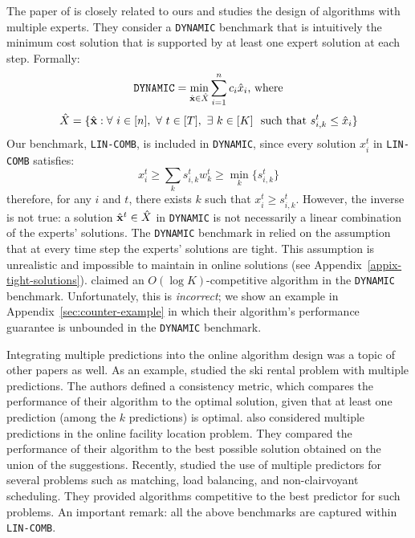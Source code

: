 The paper of \cite{AnandGe22:Online-Algorithms} is closely related to ours and studies the design of algorithms with multiple experts.
They consider a \texttt{DYNAMIC} benchmark that is intuitively
the minimum cost solution that is supported by at least one expert solution at each step. Formally:
\[\texttt{DYNAMIC} = \min_{\hat{\textbf{x}} \in \hat{X}} \sum_{i=1}^{n} c_i \hat{x}_i \textnormal{, where}\]
%
\[\hat{X} = \{\hat{\mathbf{x}} : \forall\ i \in [n],\ \forall\ t \in [T],\ \exists\ k \in [K]\ \textnormal{ such that } s_{i,k}^{t} \le \hat{x}_i \}\]
%
Our benchmark, \texttt{LIN-COMB}, is included in \texttt{DYNAMIC}, since every solution $x_{i}^{t}$ in \texttt{LIN-COMB} satisfies:
\[
	x_{i}^{t} \geq \sum_{k} s_{i,k}^{t}w_{k}^{t} \geq \min_{k} \{s_{i,k}^{t}\}
\]
therefore, for any $i$ and $t$, there exists $k$ such that $x_{i}^{t} \geq s_{i,k}^{t}$.
However, the inverse is not true: a solution $\hat{\mathbf{x}}^{t} \in \hat{X}$ in \texttt{DYNAMIC} is not necessarily
a linear combination of the experts' solutions.
The \texttt{DYNAMIC} benchmark in \cite{AnandGe22:Online-Algorithms} relied on the assumption that at every time step
the experts' solutions are tight. This assumption is unrealistic and impossible to maintain in online solutions (see Appendix~\ref{appix-tight-solutions}).
\cite{AnandGe22:Online-Algorithms} claimed an $O(\log K)$-competitive algorithm in the \texttt{DYNAMIC} benchmark.
Unfortunately, this is \emph{incorrect}; we show an example in Appendix~\ref{sec:counter-example}
in which their algorithm's performance guarantee is unbounded in the \texttt{DYNAMIC}
benchmark.


Integrating multiple predictions into the online algorithm design was a topic of other papers as well.
As an example, \cite{GollapudiPanigrahi19:skirental-multiple-predictions} studied the ski rental problem with multiple predictions.
The authors defined a consistency metric, which compares the performance of their algorithm to the optimal solution, given that at least one prediction (among the $k$ predictions) is optimal.
\cite{AlmanzaChierichetti21:Online-Facility} also considered multiple predictions in the online facility location problem.
They compared the performance of their algorithm to the best possible solution obtained on the union of the suggestions. Recently, \cite{DinitzIm:Algorithms-with} studied the use of multiple predictors for several problems such as matching, load balancing, and non-clairvoyant scheduling. They provided algorithms competitive to the best predictor for such problems.
An important remark: all the above benchmarks are captured within \texttt{LIN-COMB}.


